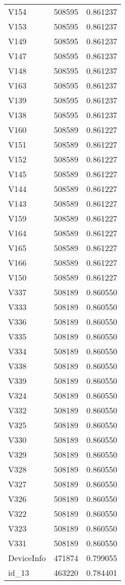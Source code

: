 \begin{tabular}{lrr}
V154 & 508595 & 0.861237 \\
V153 & 508595 & 0.861237 \\
V149 & 508595 & 0.861237 \\
V147 & 508595 & 0.861237 \\
V148 & 508595 & 0.861237 \\
V163 & 508595 & 0.861237 \\
V139 & 508595 & 0.861237 \\
V138 & 508595 & 0.861237 \\
V160 & 508589 & 0.861227 \\
V151 & 508589 & 0.861227 \\
V152 & 508589 & 0.861227 \\
V145 & 508589 & 0.861227 \\
V144 & 508589 & 0.861227 \\
V143 & 508589 & 0.861227 \\
V159 & 508589 & 0.861227 \\
V164 & 508589 & 0.861227 \\
V165 & 508589 & 0.861227 \\
V166 & 508589 & 0.861227 \\
V150 & 508589 & 0.861227 \\
V337 & 508189 & 0.860550 \\
V333 & 508189 & 0.860550 \\
V336 & 508189 & 0.860550 \\
V335 & 508189 & 0.860550 \\
V334 & 508189 & 0.860550 \\
V338 & 508189 & 0.860550 \\
V339 & 508189 & 0.860550 \\
V324 & 508189 & 0.860550 \\
V332 & 508189 & 0.860550 \\
V325 & 508189 & 0.860550 \\
V330 & 508189 & 0.860550 \\
V329 & 508189 & 0.860550 \\
V328 & 508189 & 0.860550 \\
V327 & 508189 & 0.860550 \\
V326 & 508189 & 0.860550 \\
V322 & 508189 & 0.860550 \\
V323 & 508189 & 0.860550 \\
V331 & 508189 & 0.860550 \\
DeviceInfo & 471874 & 0.799055 \\
id_13 & 463220 & 0.784401 \\

\end{tabular}
